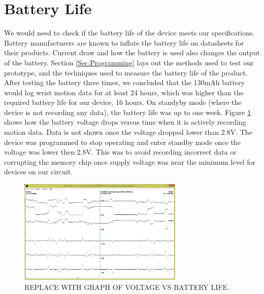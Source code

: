 \section{Battery Life}
\label{Sec:ResultsBatteryLife}
We would need to check if the battery life of the device meets our specifications.
Battery manufacturers are known to inflate the battery life on datasheets for their products.
Current draw and how the battery is used also changes the output of the battery.
Section \ref{Sec:Programming} lays out the methods used to test our prototype,
and the techniques used to measure the battery life of the product.
After testing the battery three times,
we concluded that the 130mAh battery would log wrist motion data for at least 24 hours,
which was higher than the required battery life for our device,
16 hours.
On standyby mode (where the device is not recording any data), the battery life was up to one week.
Figure \ref{Fig:BatteryGraph} shows how the battery voltage drops versus time when it is actively recording motion data.
Data is not shown once the voltage dropped lower than 2.8V. The device was programmed to stop operating and enter standby mode once the voltage was lower then 2.8V. This was to avoid recording incorrect data or corrupting the memory chip once supply voltage was near the minimum level for devices on our circuit.

\begin{figure}
\begin{center}
\includegraphics[width=0.7\textwidth]{images/WristView.jpg}
\caption{REPLACE WITH GRAPH OF VOLTAGE VS BATTERY LIFE.}
\label{Fig:BatteryGraph}
\end{center}
\end{figure}

